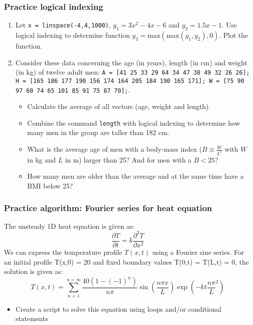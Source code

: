  \begin{frame}[fragile]
  \frametitle{Practice logical indexing}
  \begin{enumerate}
    \item Let \lstinline$x = linspace(-4,4,1000)$, $y_1 = 3x^2 - 4x - 6$ and $y_2 = 1.5x - 1$. Use logical indexing to determine function $y_3 = \mathrm{max}(\mathrm{max}(y_1,y_2),0)$. Plot the function.
    \item Consider these data concerning the age (in years), length (in cm) and weight (in kg) of twelve adult men: \lstinline$A = [41 25 33 29 64 34 47 38 49 32 26 26]; H = [165 186 177 190 156 174 164 205 184 190 165 171]; W = [75 90 97 60 74 65 101 85 91 75 87 70];$.
    \begin{itemize}
      \item Calculate the average of all vectors (age, weight and length).
      \item Combine the command \lstinline$length$ with logical indexing to determine how many men in the group are taller than 182 cm.
      \item What is the average age of men with a body-mass index ($B \equiv \frac{W}{L^2}$ with $W$ in kg and $L$ in m) larger than 25? And for men with a $B<25$?
      \item How many men are older than the average and at the same time have a BMI below 25?
    \end{itemize}
  \end{enumerate}
 \end{frame}

\begin{frame}[fragile]
  \frametitle{Practice algorithm: Fourier series for heat equation}
  The unsteady 1D heat equation is given as:
  \[
     \frac{\partial T}{\partial t} = k\frac{\partial^2 T}{\partial x^2}
  \]
 We can express the temperature profile $T(x,t)$ using a Fourier sine series. For an initial profile T(x,0) = 20 and fixed boundary values T(0,t) = T(L,t) = 0, the solution is given as:
  \[
     T(x,t) = \sum_{n=1}^{n=\infty}\frac{40(1-(-1)^n)}{n\pi}  \sin\left(\frac{n\pi x}{L}\right) \exp\left(-kt\frac{n \pi}{L}^2\right)
  \]
  \begin{itemize}
      \item Create a script to solve this equation using loops and/or conditional statements
  \end{itemize}
 \end{frame}
 
 
